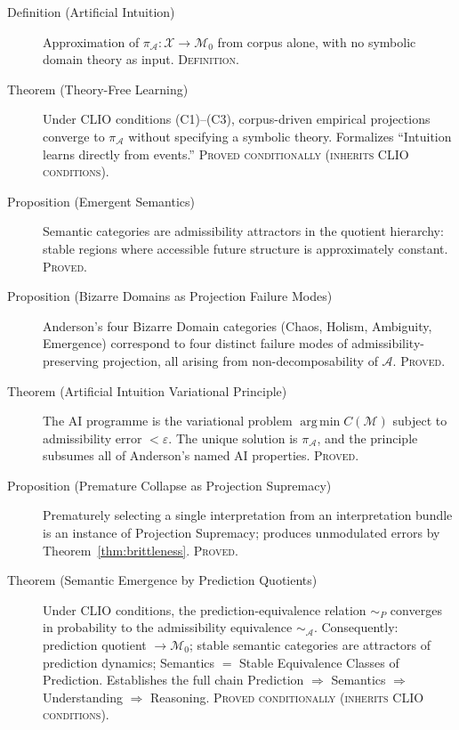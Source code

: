 \documentclass[12pt, a4paper, oneside]{book}
\newcommand{\Adm}{\mathcal{A}}
\newcommand{\X}{\mathcal{X}}
\newcommand{\M}{\mathcal{M}}
\newcommand{\projA}{\pi_{\!\Adm}}
\newcommand{\SA}{{\sim_{\!\Adm}}}
\DeclareMathOperator{\argmin}{arg\,min}
\begin{document}
\begin{description}
\item[Definition (Artificial Intuition)] Approximation of $\projA : \X \to \M_0$
  from corpus alone, with no symbolic domain theory as input.
  \textsc{Definition.}

\item[Theorem (Theory-Free Learning)] Under CLIO conditions (C1)--(C3),
  corpus-driven empirical projections converge to $\projA$ without
  specifying a symbolic theory. Formalizes ``Intuition learns directly
  from events.'' \textsc{Proved conditionally (inherits CLIO conditions).}

\item[Proposition (Emergent Semantics)] Semantic categories are
  admissibility attractors in the quotient hierarchy: stable regions
  where accessible future structure is approximately constant.
  \textsc{Proved.}

\item[Proposition (Bizarre Domains as Projection Failure Modes)]
  Anderson's four Bizarre Domain categories (Chaos, Holism, Ambiguity,
  Emergence) correspond to four distinct failure modes of
  admissibility-preserving projection, all arising from
  non-decomposability of $\Adm$. \textsc{Proved.}

\item[Theorem (Artificial Intuition Variational Principle)]
  The AI programme is the variational problem
  $\argmin C(\M)$ subject to admissibility error $< \varepsilon$.
  The unique solution is $\projA$, and the principle subsumes all of
  Anderson's named AI properties. \textsc{Proved.}

\item[Proposition (Premature Collapse as Projection Supremacy)]
  Prematurely selecting a single interpretation from an interpretation
  bundle is an instance of Projection Supremacy; produces unmodulated
  errors by Theorem~\ref{thm:brittleness}. \textsc{Proved.}

\item[Theorem (Semantic Emergence by Prediction Quotients)]
  Under CLIO conditions, the prediction-equivalence relation $\sim_P$
  converges in probability to the admissibility equivalence $\SA$.
  Consequently: prediction quotient $\to \M_0$; stable semantic
  categories are attractors of prediction dynamics; Semantics $=$
  Stable Equivalence Classes of Prediction. Establishes the full chain
  Prediction $\Rightarrow$ Semantics $\Rightarrow$ Understanding
  $\Rightarrow$ Reasoning. \textsc{Proved conditionally (inherits CLIO
  conditions).}


\end{description}
\end{document}
